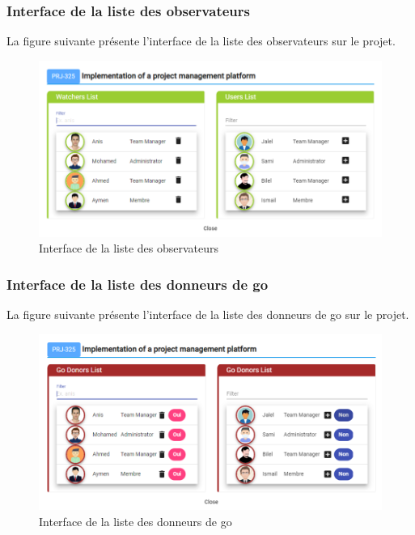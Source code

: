 \subsubsection{Interface de la liste des observateurs }
\hspace{4mm}La figure suivante présente l’interface de la liste des observateurs sur le projet.
\begin{figure}[h]
    \centering
    \includegraphics{figures/33anis22.png}
    \caption{Interface de la liste des observateurs}
    \label{fig:interface_observateur}
\end{figure}\newpage
\subsubsection{Interface de la liste des donneurs de go }
\hspace{4mm}La figure suivante présente l’interface de la liste des donneurs de go sur le projet.
\begin{figure}[h]
    \centering
    \includegraphics{figures/33anis23.png}
    \caption{Interface de la liste des donneurs de go}
    \label{fig:interface_donneur}
\end{figure}
